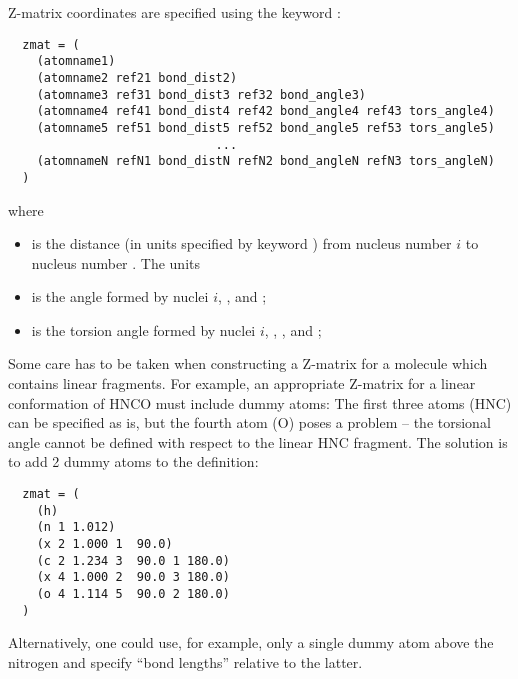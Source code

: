 \noindent
Z-matrix coordinates are specified using the keyword :
\begin{verbatim}
  zmat = (
    (atomname1)
    (atomname2 ref21 bond_dist2)
    (atomname3 ref31 bond_dist3 ref32 bond_angle3)
    (atomname4 ref41 bond_dist4 ref42 bond_angle4 ref43 tors_angle4)
    (atomname5 ref51 bond_dist5 ref52 bond_angle5 ref53 tors_angle5)
                             ...                
    (atomnameN refN1 bond_distN refN2 bond_angleN refN3 tors_angleN)
  )
\end{verbatim}
where
\begin{itemize}
\item {} is the distance (in units specified by
keyword ) from nucleus number $i$ to
nucleus number . The units 
\item {} is the angle formed by nuclei $i$,
, and ;
\item {} is the torsion angle formed by nuclei $i$,
, , and ;
\end{itemize}
Some care has to be taken when constructing a Z-matrix for a molecule
which contains linear fragments. For example, an appropriate Z-matrix
for a linear conformation of HNCO must include dummy atoms: The first
three atoms (HNC) can be specified as is, but the fourth atom (O)
poses a problem -- the torsional angle cannot be defined with respect
to the linear HNC fragment. The solution is to add 2 dummy atoms to
the definition:
\begin{verbatim}
  zmat = (
    (h)
    (n 1 1.012)
    (x 2 1.000 1  90.0)
    (c 2 1.234 3  90.0 1 180.0)
    (x 4 1.000 2  90.0 3 180.0)
    (o 4 1.114 5  90.0 2 180.0)
  )
\end{verbatim}
Alternatively, one could use, for example, only a single dummy atom above the
nitrogen and specify ``bond lengths'' relative to the latter.

